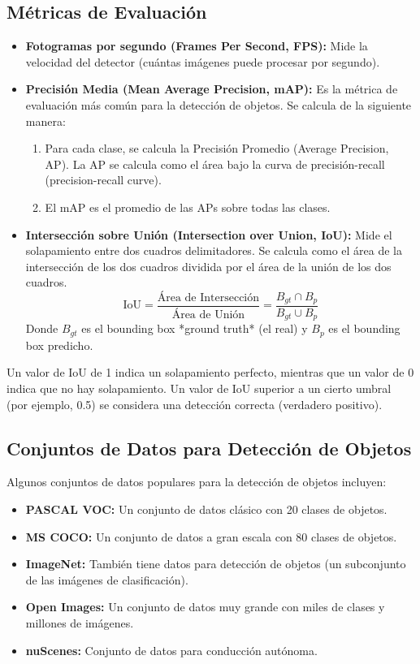 \documentclass{article}
\begin{document}
\subsection{Métricas de Evaluación}

\begin{itemize}
    \item \textbf{Fotogramas por segundo (Frames Per Second, FPS):}  Mide la velocidad del detector (cuántas imágenes puede procesar por segundo).
    \item \textbf{Precisión Media (Mean Average Precision, mAP):}  Es la métrica de evaluación más común para la detección de objetos.  Se calcula de la siguiente manera:
        \begin{enumerate}
            \item Para cada clase, se calcula la Precisión Promedio (Average Precision, AP).  La AP se calcula como el área bajo la curva de precisión-recall (precision-recall curve).
            \item El mAP es el promedio de las APs sobre todas las clases.
        \end{enumerate}
    \item \textbf{Intersección sobre Unión (Intersection over Union, IoU):} Mide el solapamiento entre dos cuadros delimitadores. Se calcula como el área de la intersección de los dos cuadros dividida por el área de la unión de los dos cuadros.
    \[
        \text{IoU} = \frac{\text{Área de Intersección}}{\text{Área de Unión}} = \frac{B_{gt} \cap B_p}{B_{gt} \cup B_p}
    \]
    Donde \(B_{gt}\) es el bounding box *ground truth* (el real) y \(B_p\) es el bounding box predicho.
\end{itemize}
Un valor de IoU de 1 indica un solapamiento perfecto, mientras que un valor de 0 indica que no hay solapamiento.  Un valor de IoU superior a un cierto umbral (por ejemplo, 0.5) se considera una detección correcta (verdadero positivo).

\subsection{Conjuntos de Datos para Detección de Objetos}

Algunos conjuntos de datos populares para la detección de objetos incluyen:

\begin{itemize}
    \item \textbf{PASCAL VOC:}  Un conjunto de datos clásico con 20 clases de objetos.
    \item \textbf{MS COCO:}  Un conjunto de datos a gran escala con 80 clases de objetos.
    \item \textbf{ImageNet:}  También tiene datos para detección de objetos (un subconjunto de las imágenes de clasificación).
    \item \textbf{Open Images:} Un conjunto de datos muy grande con miles de clases y millones de imágenes.
     \item \textbf{nuScenes:} Conjunto de datos para conducción autónoma.
\end{itemize}
\end{document}
